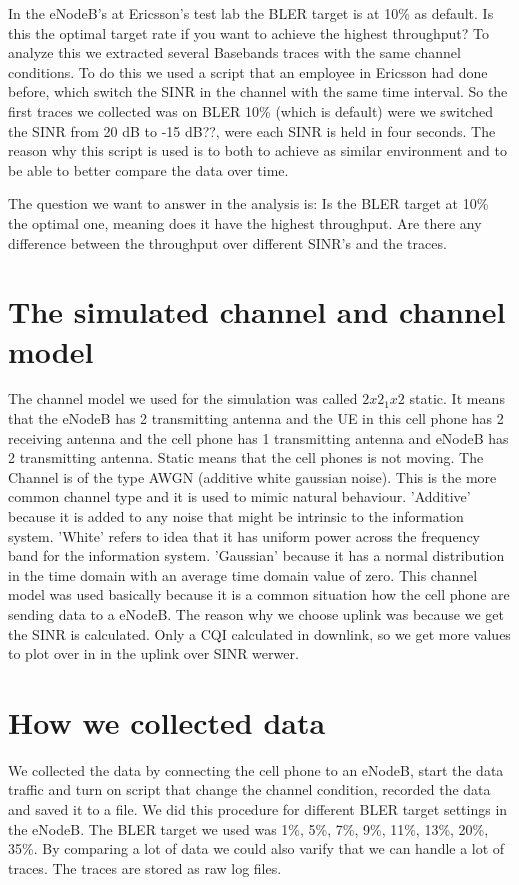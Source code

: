 \documentclass[cropmarks, frame, english]{idamasterthesis}
\begin{document}
In the eNodeB's at Ericsson's test lab the BLER target is at 10\% as default. Is this the optimal target rate if you want to achieve the highest throughput? To analyze this we extracted several Basebands traces with the same channel conditions. To do this we used a script that an employee in Ericsson had done before, which switch the SINR in the channel with the same time interval. So the first traces we collected was on BLER 10\% (which is default) were we switched the SINR from 20 dB to -15 dB??, were each SINR is held in four
seconds. The reason why this script is used is to both to achieve as similar environment and to be able to better compare the data over time.

The question we want to answer in the analysis is:
Is the BLER target at 10\% the optimal one, meaning does it have the highest throughput.
Are there any difference between the throughput over different SINR's and the traces.

\section{The simulated channel and channel model}
The channel model we used for the simulation was called $2x2_1x2$ static. It means that the eNodeB has 2 transmitting antenna and the UE in this cell phone has 2 receiving antenna and the cell phone has 1 transmitting antenna and eNodeB has 2 transmitting antenna. Static means that the cell phones is not moving. The Channel is of the type AWGN (additive white gaussian noise). This is the more common channel type and it is used to mimic natural behaviour.
'Additive' because it is added to any noise that might be intrinsic to the information system.
'White' refers to idea that it has uniform power across the frequency band for the information system.
'Gaussian' because it has a normal distribution in the time domain with an average time domain value of zero.
This channel model was used basically because it is a common situation how the cell phone are sending data to a eNodeB. The reason why we choose uplink was because we get the SINR is calculated. Only a CQI calculated in downlink, so we get more values to plot over in in the uplink over SINR werwer.


\section{How we collected data}
We collected the data by connecting the cell phone to an eNodeB, start the data traffic and turn
on script that change the channel condition, recorded the data and saved it to a file. We did this procedure for different BLER target settings in the eNodeB. The BLER target we used was 1\%, 5\%, 7\%, 9\%, 11\%, 13\%, 20\%, 35\%. By comparing a lot of data we could also varify that we can handle a lot of traces. The traces are stored as raw log files. \\
\end{document}
